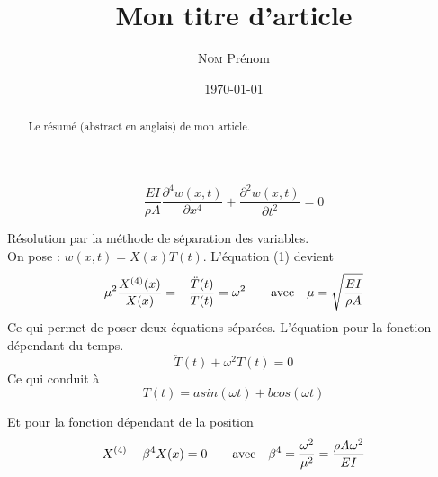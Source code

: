 \documentclass[a4paper,10pt]{article}
\author{\textsc{Nom} Prénom}
\date{\today}
\title{Mon titre d'article}
\begin{document}
\begin{abstract}
Le résumé (abstract en anglais) de mon article.
\end{abstract}

\begin{equation} %
 \frac{E I}{\rho A}  \frac{\partial^4 w(x,t)}{\partial x^4} + \frac{\partial^2 w(x,t)}{\partial t^2  } = 0
 \end{equation}

Résolution par la méthode de séparation des variables.\\
On pose : \begin{math} w(x,t) = X(x)T(t)\end{math}.                                                      
L'équation (1) devient 
\begin{equation} %
 \mu ^2   \frac{X^{(4)}(x)}{X(x)} = - \frac{ \ddot T(t)}{T(t)}  = \omega^2  \text{\qquad avec\quad} \mu = \sqrt{ \frac{E I}{\rho A} }  \end{equation}
Ce qui permet de poser deux équations séparées. L'équation pour la fonction dépendant du temps.
\begin{equation} \ddot T(t)+ \omega^2 T(t) = 0  \end{equation}
Ce qui conduit à
\begin{equation} T(t) = a sin(\omega t) + b cos(\omega t) \end{equation}

Et pour la fonction dépendant de la position
\begin{equation} X^{(4)} - \beta^4 X(x) = 0 \text{\qquad avec\quad} \beta^4 = \frac{\omega^2}{\mu^2}=  \frac{\rho A \omega^2}{EI}    \end{equation}
\end{document}
